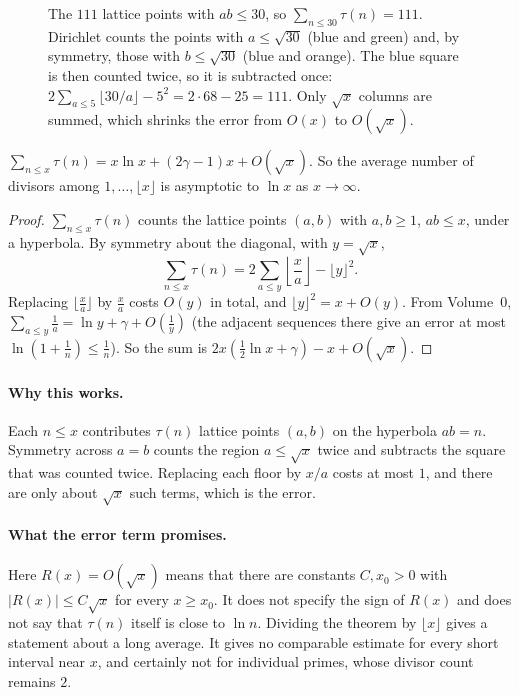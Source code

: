 \begin{figure}[ht]
\centering
{}
\caption{The $111$ lattice points with $ab\le30$, so $\sum_{n\le30}\tau(n)=111$. Dirichlet counts the points with $a\le\sqrt{30}$ (blue and green) and, by symmetry, those with $b\le\sqrt{30}$ (blue and orange). The blue square is then counted twice, so it is subtracted once: $2\sum_{a\le5}\lfloor30/a\rfloor-5^2=2\cdot68-25=111$. Only $\sqrt x$ columns are summed, which shrinks the error from $O(x)$ to $O(\sqrt x)$.}
\label{fig:hyperbola}
\end{figure}

\begin{theorem}[Dirichlet]\label{thm:hyperbola}
$\displaystyle\sum_{n\le x}\tau(n)=x\ln x+(2\gamma-1)x+O(\sqrt x)$. So the average number of divisors among $1,\dots,\lfloor x\rfloor$ is asymptotic to $\ln x$ as $x\to\infty$.
\end{theorem}
\begin{proof}
$\sum_{n\le x}\tau(n)$ counts the lattice points $(a,b)$ with $a,b\ge1$, $ab\le x$, under a hyperbola. By symmetry about the diagonal, with $y=\sqrt x$,
\[
\sum_{n\le x}\tau(n)=2\sum_{a\le y}\left\lfloor\frac xa\right\rfloor-\lfloor y\rfloor^2.
\]
Replacing $\lfloor\frac xa\rfloor$ by $\frac xa$ costs $O(y)$ in total, and $\lfloor y\rfloor^2=x+O(y)$. From Volume~0, $\sum_{a\le y}\frac1a=\ln y+\gamma+O\left(\frac1y\right)$ (the adjacent sequences there give an error at most $\ln(1+\frac1n)\le\frac1n$). So the sum is $2x\left(\frac12\ln x+\gamma\right)-x+O(\sqrt x)$.
\end{proof}

\paragraph{Why this works.}
Each $n\le x$ contributes $\tau(n)$ lattice points $(a,b)$ on the hyperbola $ab=n$. Symmetry across $a=b$ counts the region $a\le\sqrt x$ twice and subtracts the square that was counted twice. Replacing each floor by $x/a$ costs at most $1$, and there are only about $\sqrt x$ such terms, which is the error.

\paragraph{What the error term promises.}
Here $R(x)=O(\sqrt x)$ means that there are constants $C,x_0>0$ with
$|R(x)|\le C\sqrt x$ for every $x\ge x_0$. It does not specify the sign
of $R(x)$ and does not say that $\tau(n)$ itself is close to $\ln n$.
Dividing the theorem by $\lfloor x\rfloor$ gives a statement about a
long average. It gives no comparable estimate for every short interval near
$x$, and certainly not for individual primes, whose divisor count remains $2$.

